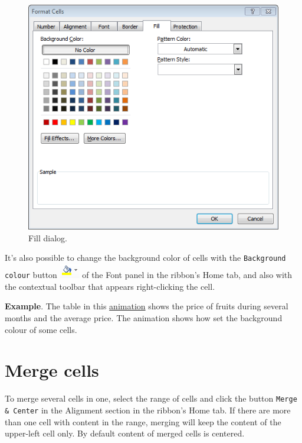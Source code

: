 \begin{figure}[htbp]
\begin{center}
\includegraphics[scale=0.7]{../img/fill_dialog.png}
\end{center}
\caption{Fill dialog.}
\label{img-fill_dialog}
\end{figure}

It's also possible to change the background color of cells with the \texttt{Background colour} button 
\includegraphics[scale=0.7]{../img/button_background_colour.png} of the Font panel in the ribbon's Home tab, and
also with the contextual toolbar that appears right-clicking the cell.

\textbf{Example}. The table in this \href{http://aprendeconalf.es/office/excel/manual/img/example_background_colour.gif}{animation} shows the price of fruits during several months and the average price. The animation shows how set the background colour of some cells.

\section{Merge cells}\hypertarget{merge-cells}{}\label{merge-cells}

To merge several cells in one, select the range of cells and click the button \texttt{Merge \& Center} in the Alignment
section in the ribbon's Home tab. If there are more than one cell with content in the range, merging will keep the
content of the upper-left cell only. By default content of merged cells is centered.

